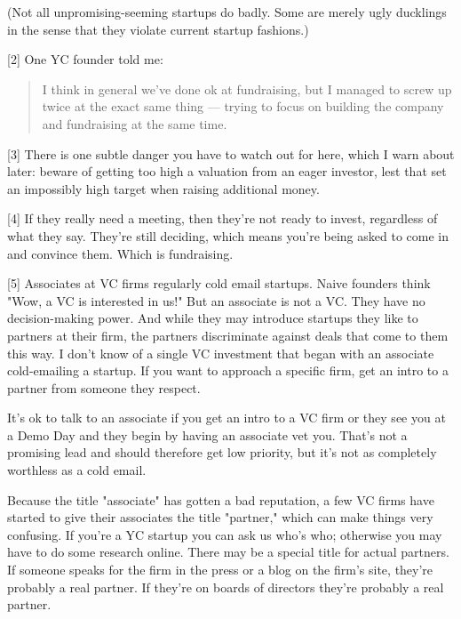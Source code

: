 (Not all unpromising-seeming startups do
                    badly. Some are merely ugly ducklings in the sense that they
                    violate current startup fashions.)

[2] One YC founder told me:
                  


                  \begin{quote}

                    I think in general we've done ok at fundraising, but I
                    managed to screw up twice at the exact same thing ---
                    trying to focus on building the company and fundraising at
                    the same time.
                  
\end{quote}

                  [3] There is one subtle danger you have to watch out for here,
                  which I warn about later: beware of getting too high a
                  valuation from an eager investor, lest that set an impossibly
                  high target when raising additional money.

[4] If they really need a meeting, then they're not ready to
                  invest, regardless of what they say. They're still deciding,
                  which means you're being asked to come in and convince them.
                  Which is fundraising.

[5] Associates at VC firms regularly cold email startups. Naive
                  founders think "Wow, a VC is interested in us!" But an
                  associate is not a VC. They have no decision-making power. And
                  while they may introduce startups they like to partners at
                  their firm, the partners discriminate against deals that come
                  to them this way. I don't know of a single VC investment that
                  began with an associate cold-emailing a startup. If you want
                  to approach a specific firm, get an intro to a partner from
                  someone they respect.

It's ok to talk to an
                  associate if you get an intro to a VC firm or they see you at
                  a Demo Day and they begin by having an associate vet you.
                  That's not a promising lead and should therefore get low
                  priority, but it's not as completely worthless as a cold
                  email.

Because the title "associate" has gotten a
                  bad reputation, a few VC firms have started to give their
                  associates the title "partner," which can make things very
                  confusing. If you're a YC startup you can ask us who's who;
                  otherwise you may have to do some research online. There may
                  be a special title for actual partners. If someone speaks for
                  the firm in the press or a blog on the firm's site, they're
                  probably a real partner. If they're on boards of directors
                  they're probably a real partner.

